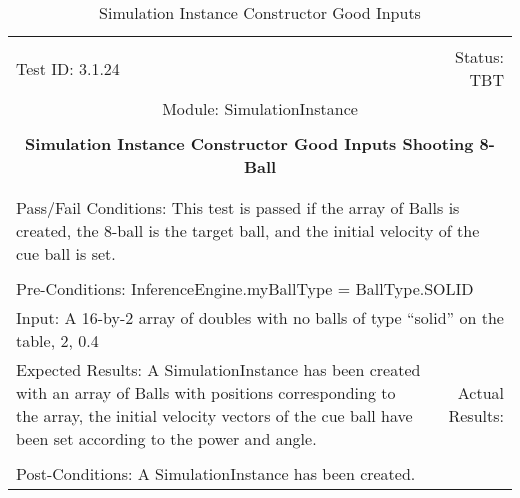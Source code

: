 \documentclass[titlepage]{article}
\begin{document}
\begin{center}%
\begin{table}
\begin{tabular}{|l r|}\hline&\\[-2mm]
	Test ID: 3.1.24	&Status: TBT\\[-3mm]
	\multicolumn{2}{|c|}{Module: SimulationInstance}\\&\\
	\multicolumn{2}{|c|}{\textbf{\large{Simulation Instance Constructor Good Inputs Shooting 8-Ball}}}\\&\\\hline&\\[-3mm]
	\multicolumn{2}{|p{\textwidth}|}{Pass/Fail Conditions: This test is passed if the array of Balls is created, the 8-ball is the target ball, and the initial velocity of the cue ball is set.}\\[1mm]\hline&\\[-3mm]
	\multicolumn{2}{|p{\textwidth}|}{Pre-Conditions: InferenceEngine.myBallType = BallType.SOLID}\\[4mm]
	\multicolumn{2}{|p{\textwidth}|}{Input: A 16-by-2 array of doubles with no balls of type ``solid'' on the table, 2, 0.4}\\[2mm]\hline
	\multicolumn{1}{|p{0.49\textwidth}}{Expected Results: A SimulationInstance has been created with an array of Balls with positions corresponding to the array, the initial velocity vectors of the cue ball have been set according to the power and angle.}	&\multicolumn{1}{|p{0.45\textwidth}|}{Actual Results: }\\\hline&\\[-3mm]
	\multicolumn{2}{|p{\textwidth}|}{Post-Conditions: A SimulationInstance has been created.}\\\hline
\end{tabular}
\caption{Simulation Instance Constructor Good Inputs}
\end{table}
\end{center}
\end{document}
